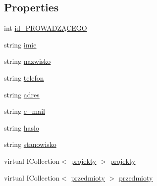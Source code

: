 \subsection*{Properties}
\begin{DoxyCompactItemize}
\item 
int \hyperlink{class_dziennik_ocen_web2_1_1_p_r_o_w_a_d_z_xC4_x84_c_y_a7dcd6e92f2608ce325caf03848c9a6cc}{id\+\_\+\+P\+R\+O\+W\+A\+D\+ZĄ\+C\+E\+GO}
\item 
string \hyperlink{class_dziennik_ocen_web2_1_1_p_r_o_w_a_d_z_xC4_x84_c_y_a4624ff211cddc1cd9bd185c36a64e3eb}{imie}
\item 
string \hyperlink{class_dziennik_ocen_web2_1_1_p_r_o_w_a_d_z_xC4_x84_c_y_a6e1639cae3730eb1b1ead2d47e9e96c2}{nazwisko}
\item 
string \hyperlink{class_dziennik_ocen_web2_1_1_p_r_o_w_a_d_z_xC4_x84_c_y_a9ee1eefae1f29701591518d3297c4032}{telefon}
\item 
string \hyperlink{class_dziennik_ocen_web2_1_1_p_r_o_w_a_d_z_xC4_x84_c_y_a44b226293d5a00932f4e384fe662dd72}{adres}
\item 
string \hyperlink{class_dziennik_ocen_web2_1_1_p_r_o_w_a_d_z_xC4_x84_c_y_a8f0df2c44f1fe2ebe56836f1b7b07cea}{e\+\_\+mail}
\item 
string \hyperlink{class_dziennik_ocen_web2_1_1_p_r_o_w_a_d_z_xC4_x84_c_y_a306ee08043279dd4759d7904d5ff160e}{haslo}
\item 
string \hyperlink{class_dziennik_ocen_web2_1_1_p_r_o_w_a_d_z_xC4_x84_c_y_ab465d45b36ee6026fced7c03010ebba4}{stanowisko}
\item 
virtual I\+Collection$<$ \hyperlink{class_dziennik_ocen_web2_1_1projekty}{projekty} $>$ \hyperlink{class_dziennik_ocen_web2_1_1_p_r_o_w_a_d_z_xC4_x84_c_y_ad52be8d9b27ab4f26a1054c2e8cfd09a}{projekty}
\item 
virtual I\+Collection$<$ \hyperlink{class_dziennik_ocen_web2_1_1przedmioty}{przedmioty} $>$ \hyperlink{class_dziennik_ocen_web2_1_1_p_r_o_w_a_d_z_xC4_x84_c_y_a5e92f093e7b3361330f2c723cf5a767e}{przedmioty}
\end{DoxyCompactItemize}


